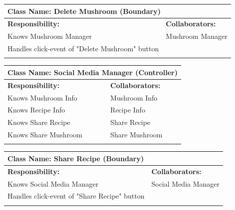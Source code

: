 \documentclass[]{article}
\begin{document}
\begin{itemize}
        \begin{table}[ht]
		\centering
		\begin{tabular}{|p{6cm}|p{6cm}|}
		\hline 
		\multicolumn{2}{|l|}{\textbf{Class Name: Delete Mushroom (Boundary)}} \\
		\hline
		\textbf{Responsibility:} & \textbf{Collaborators:} \\
		\hline
		Knows Mushroom Manager & Mushroom Manager\\
		Handles click-event of "Delete Mushroom" button&\\
		\vspace{1in} & \\
		\hline
		\end{tabular}
	\end{table}    

   \begin{table}[ht]
		\centering
		\begin{tabular}{|p{6cm}|p{6cm}|}
		\hline 
		\multicolumn{2}{|l|}{\textbf{Class Name: Social Media Manager (Controller)}} \\
		\hline
		\textbf{Responsibility:} & \textbf{Collaborators:} \\
		\hline
            Knows Mushroom Info & Mushroom Info\\
		Knows Recipe Info & Recipe Info\\
		Knows Share Recipe & Share Recipe\\
            Knows Share Mushroom & Share Mushroom\\
		\vspace{1in} & \\
		\hline
		\end{tabular}
	\end{table}

        \begin{table}[ht]
		\centering
		\begin{tabular}{|p{6cm}|p{6cm}|}
		\hline 
		\multicolumn{2}{|l|}{\textbf{Class Name: Share Recipe (Boundary)}} \\
		\hline
		\textbf{Responsibility:} & \textbf{Collaborators:} \\
		\hline
		Knows Social Media Manager & Social Media Manager\\
		Handles click-event of "Share Recipe" button&\\
		\vspace{1in} & \\
		\hline
		\end{tabular}
	\end{table} 


\end{itemize}
\end{document}
